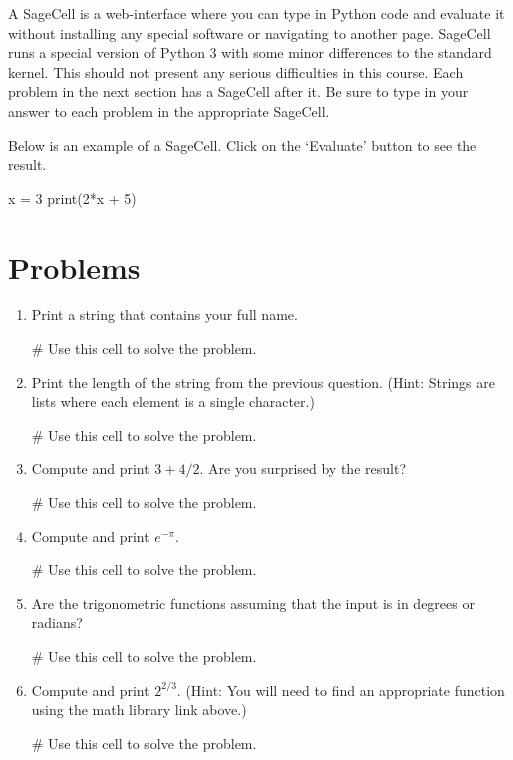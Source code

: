 \documentclass{ximera}
\begin{document}
A SageCell is a web-interface where you can type in Python code and evaluate it without installing any special software or navigating to another page. SageCell runs a special version of Python 3 with some minor differences to the standard kernel. This should not present any serious difficulties in this course. Each problem in the next section has a SageCell after it. Be sure to type in your answer to each problem in the appropriate SageCell.

Below is an example of a SageCell. Click on the `Evaluate' button to see the result.

\begin{sageCell}
x = 3
print(2*x + 5)
\end{sageCell}

\section{Problems}
\begin{enumerate}
    \item Print a string that contains your full name.
\begin{sageCell}
# Use this cell to solve the problem.
\end{sageCell}

    \item Print the length of the string from the previous question. (Hint: Strings are lists where each element is a single character.)
\begin{sageCell}
# Use this cell to solve the problem.
\end{sageCell}

    \item Compute and print $3+4/2$. Are you surprised by the result?
\begin{sageCell}
# Use this cell to solve the problem.
\end{sageCell}

    \item Compute and print $e^{-\pi}$.
\begin{sageCell}
# Use this cell to solve the problem.
\end{sageCell}

    \item Are the trigonometric functions assuming that the input is in degrees or radians?
\begin{sageCell}
# Use this cell to solve the problem.
\end{sageCell}

    \item Compute and print $2^{2/3}$. (Hint: You will need to find an appropriate function using the math library link above.)
\begin{sageCell}
# Use this cell to solve the problem.
\end{sageCell}

\end{enumerate}
\end{document}
